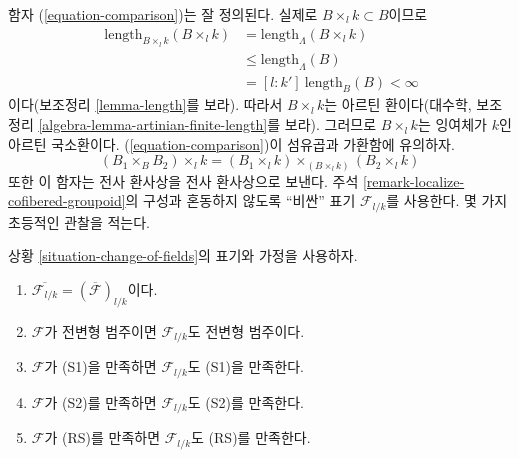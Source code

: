 \noindent
함자 (\ref{equation-comparison})는 잘 정의된다. 실제로
$B \times_l k \subset B$이므로
\begin{align*}
[k : k']\ \text{length}_{B \times_l k}(B \times_l k) & =
\text{length}_\Lambda(B \times_l k) \\
& \leq \text{length}_\Lambda(B) \\
& = [l : k']\ \text{length}_B(B) < \infty
\end{align*}
이다(보조정리 \ref{lemma-length}를 보라). 따라서 $B \times_l k$는
아르틴 환이다(대수학, 보조정리
\ref{algebra-lemma-artinian-finite-length}를 보라).
그러므로 $B \times_l k$는 잉여체가 $k$인 아르틴 국소환이다.
(\ref{equation-comparison})이 섬유곱과 가환함에 유의하자.
$$
(B_1 \times_B B_2) \times_l k =
(B_1 \times_l k) \times_{(B \times_l k)} (B_2 \times_l k)
$$
또한 이 함자는 전사 환사상을 전사 환사상으로 보낸다.
주석 \ref{remark-localize-cofibered-groupoid}의 구성과 혼동하지 않도록
``비싼'' 표기 $\mathcal{F}_{l/k}$를 사용한다. 몇 가지 초등적인 관찰을 적는다.

\begin{lemma}
\label{lemma-elementary-properties-change-of-field}
상황 \ref{situation-change-of-fields}의 표기와 가정을 사용하자.
\begin{enumerate}
\item $\overline{\mathcal{F}_{l/k}} = (\overline{\mathcal{F}})_{l/k}$이다.
\item $\mathcal{F}$가 전변형 범주이면 $\mathcal{F}_{l/k}$도
전변형 범주이다.
\item $\mathcal{F}$가 (S1)을 만족하면 $\mathcal{F}_{l/k}$도
(S1)을 만족한다.
\item $\mathcal{F}$가 (S2)를 만족하면 $\mathcal{F}_{l/k}$도
(S2)를 만족한다.
\item $\mathcal{F}$가 (RS)를 만족하면 $\mathcal{F}_{l/k}$도
(RS)를 만족한다.
\end{enumerate}
\end{lemma}

